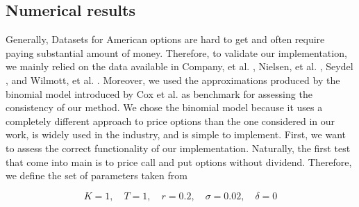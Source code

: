 \subsection{Numerical results}
Generally, Datasets for American options are hard to get and often require paying substantial amount of money. Therefore, to validate our implementation, we mainly relied on the data available in Company, 
et al. \cite*{company_egorova_jodar_2014}, Nielsen, et al. \cite*{nielsen_2001}, Seydel \cite*{seydel_2009}, and Wilmott, et al. \cite*{wilmott_howison_dewynne_1995}. Moreover, we used the approximations produced by the binomial model introduced by Cox et al. \cite{cox_1979} as benchmark for assessing the consistency of our method. We chose the binomial model because it uses a completely different approach to price options than the one considered in our work, is widely used in the industry, and is simple to implement. First, 
we want to assess the correct functionality of our implementation. Naturally, the first test that come into main is to price call and put options without dividend. Therefore, we define the set of parameters taken from \cite{nielsen_2001}

\begin{equation}
  \label{eq:numericaresults:parameters_set_1}
  K = 1, \quad T = 1, \quad r=0.2, \quad \sigma=0.02, \quad \delta = 0 
\end{equation}

